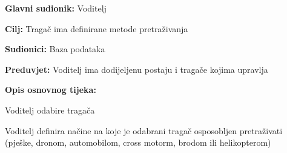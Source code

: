 					\noindent {}
					\begin{packed_item}
						
						\item \textbf{Glavni sudionik: }Voditelj
						\item  \textbf{Cilj:} Tragač ima definirane metode pretraživanja
						\item  \textbf{Sudionici:} Baza podataka
						\item  \textbf{Preduvjet:} Voditelj ima dodijeljenu postaju i tragače kojima upravlja
						\item  \textbf{Opis osnovnog tijeka:}
						
						\item[] \begin{packed_enum}
							
							\item Voditelj odabire tragača
							\item Voditelj definira načine na koje je odabrani tragač osposobljen pretraživati (pješke, dronom, automobilom, cross motorm, brodom ili helikopterom)
							
							
						\end{packed_enum}
						
						
					\end{packed_item}
					
